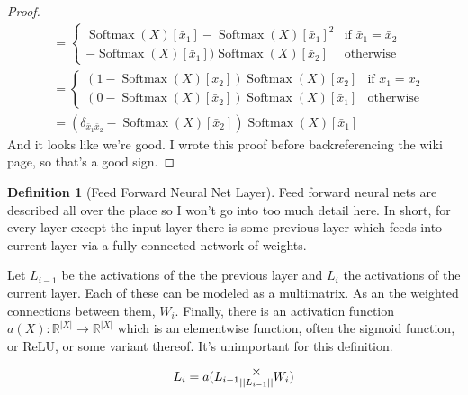 \documentclass[12pt]{book}
\theoremstyle{plain}
\theoremstyle{definition}
\newtheorem{definition}{Definition}[chapter]
\theoremstyle{ppart}
\theoremstyle{case}
\theoremstyle{solution}
\DeclareMathOperator{\Softmax}{Softmax}
\newcommand{\mmult}[1]{\text{\raisebox{1ex}{$\underset{#1}{\times}$}}}
\newcommand{\shape}[1]{\left|#1\right|}
\begin{document}
\begin{landscape}
\begin{proof}
\begin{align*}
	&= \left\{
  \begin{array}{ll}
    \Softmax(X)[\bar{x}_1]-\Softmax(X)[\bar{x}_1]^2
			& \mbox{if } \bar{x}_1 = \bar{x}_2 \\
    -\Softmax(X)[\bar{x}_1])\Softmax(X)[\bar{x}_2]
			& \mbox{otherwise}
  \end{array}
	\right. \\
	&= \left\{
  \begin{array}{ll}
    (1-\Softmax(X)[\bar{x}_2])\Softmax(X)[\bar{x}_2]
			& \mbox{if } \bar{x}_1 = \bar{x}_2 \\
    (0-\Softmax(X)[\bar{x}_2])\Softmax(X)[\bar{x}_1]
			& \mbox{otherwise}
  \end{array}
	\right. \\
	&= (\delta_{\bar{x}_1 \bar{x}_2} - \Softmax(X)[\bar{x}_2])
	\Softmax(X)[\bar{x}_1]
\end{align*}
And it looks like we're good. I wrote this proof before backreferencing the wiki
page, so that's a good sign.
\end{proof}
\end{landscape}

\begin{definition}[Feed Forward Neural Net Layer]
Feed forward neural nets are described all over the place so I won't go into too
much detail here. In short, for every layer except the input layer there is some
previous layer which feeds into current layer via a fully-connected network of
weights.

Let $L_{i-1}$ be the activations of the the previous layer and $L_i$ the activations
of the current layer. Each of these can be modeled as a multimatrix. As an the weighted
connections between them, $W_i$. Finally, there is an activation function
$a(X) : \mathbb{R}^{\shape{X}} \to \mathbb{R}^{\shape{X}}$ which is an elementwise function,
often the sigmoid function, or ReLU, or some variant thereof. It's unimportant for this
definition.

\[ L_i = a(L_{i-1} \mmult{\shape{\shape{L_{i-1}}}} W_i) \]
\end{definition}
\end{document}
